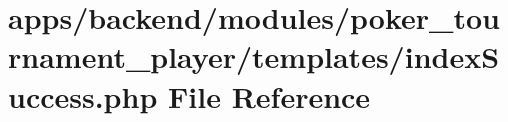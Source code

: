 \hypertarget{backend_2modules_2poker__tournament__player_2templates_2index_success_8php}{\section{apps/backend/modules/poker\-\_\-tournament\-\_\-player/templates/index\-Success.php File Reference}
\label{backend_2modules_2poker__tournament__player_2templates_2index_success_8php}
}
